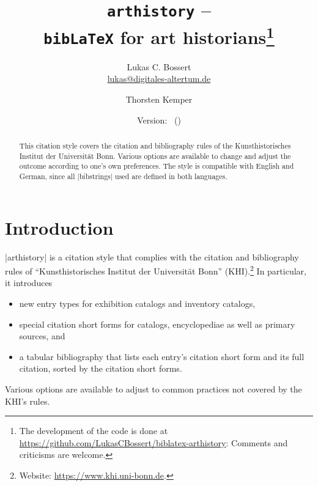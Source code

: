 \documentclass[a4paper,
10pt,
ngerman,
english
]{ltxdoc}
\begin{document}
\title{\texttt{arthistory} -- \\\texttt{bib\LaTeX} for art historians\footnote{The development of the code is done at \url{https://github.com/LukasCBossert/biblatex-arthistory}: 
Comments and criticisms are welcome.}}

\author{Lukas C. Bossert\protect\\%
{\small \href{mailto:lukas@digitales-altertum.de}{lukas@digitales-altertum.de}}
 \and Thorsten Kemper}
 
\date{Version: \arthistoryversion\ (\arthistorydate)
} 
\maketitle
 
 \begin{abstract}
\noindent This citation style covers the citation and bibliography rules of the Kunsthistorisches Institut der Universität Bonn.
Various options are available to change and adjust the outcome according to one's own preferences. 
The style is compatible with English and German, since all |bibstrings| used are defined in both languages.
 \end{abstract}


\begin{multicols}{2}
\footnotesize\parskip=0mm \tableofcontents
\end{multicols}

\section{Introduction}
|arthistory| is a citation style that complies with the citation and bibliography rules of \enquote{Kunsthistorisches Institut der Universität Bonn} (KHI).\footnote{Website: \url{https://www.khi.uni-bonn.de}.} In particular, it introduces
\begin{itemize}
	\item new entry types for exhibition catalogs and inventory catalogs,
	\item special citation short forms for catalogs, encyclopediae as well as primary sources, and
	\item a tabular bibliography that lists each entry's citation short form and its full citation, sorted by the citation short forms.
\end{itemize}
Various options are available to adjust to common practices not covered by the KHI's rules.
\end{document}
